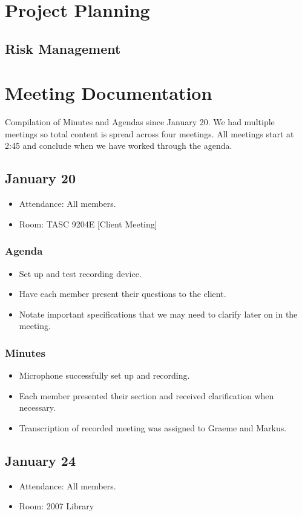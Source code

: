 \documentclass{article}
\begin{document}
\section{Project Planning}
\subsection{Risk Management}

\section{Meeting Documentation}
Compilation of Minutes and Agendas since January 20.  We had multiple meetings so total content is spread across four meetings.  All meetings start at 2:45 and conclude when we have worked through the agenda.

\subsection{January 20}
\begin{itemize}
\item Attendance: All members.
\item Room: TASC 9204E [Client Meeting]
\end{itemize}
\subsubsection{Agenda}
\begin{itemize}
\item Set up and test recording device.
\item Have each member present their questions to the client.
\item Notate important specifications that we may need to clarify later on in the meeting.
\end{itemize}
\subsubsection{Minutes}
\begin{itemize}
\item Microphone successfully set up and recording.
\item Each member presented their section and received clarification when necessary.
\item Transcription of recorded meeting was assigned to Graeme and Markus.
\end{itemize}

\subsection{January 24}
\begin{itemize}
\item Attendance: All members.
\item Room: 2007 Library
\end{itemize}
\end{document}

